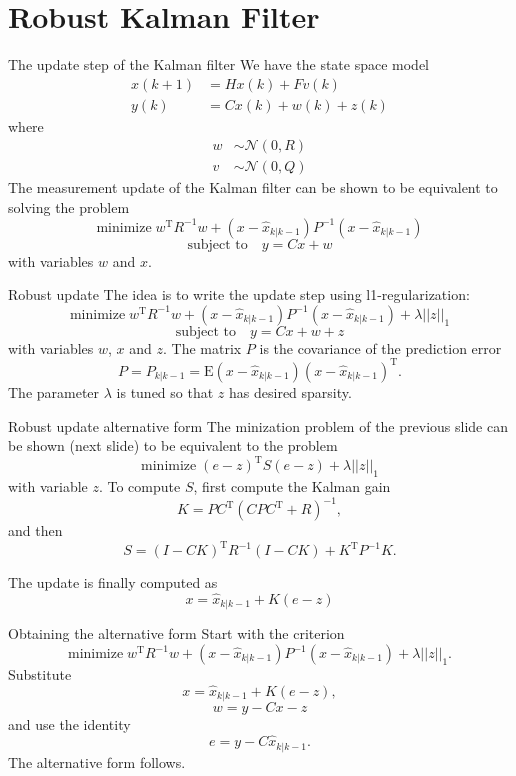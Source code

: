 \documentclass[presentation,aspectratio=169]{beamer}
\begin{document}
\section{Robust Kalman Filter}
\label{sec-3}
\begin{frame}[label=sec-3-1]{The update step of the Kalman filter}
We have the state space model
\begin{align*}
x(k+1) &= Hx(k) + Fv(k)\\
y(k) &= Cx(k) + w(k) + z(k)
\end{align*}
where
\begin{align*}
w &\sim \mathcal{N}(0,R)\\
v &\sim \mathcal{N}(0,Q)
\end{align*}
The measurement update of the Kalman filter can be shown to be equivalent to solving the problem
\[ \text{minimize} \; w^{\mathrm{T}} R^{-1} w + (x-\hat{x}_{k|k-1})P^{-1}(x-\hat{x}_{k|k-1}) \]
\[ \text{subject to}\quad y = Cx + w \]
with variables $w$ and $x$.
\end{frame}
\begin{frame}[label=sec-3-2]{Robust update}
The idea is to write the update step using l1-regularization:
\[ \text{minimize} \; w^{\mathrm{T}} R^{-1} w + (x-\hat{x}_{k|k-1})P^{-1}(x-\hat{x}_{k|k-1}) + \lambda||z||_1 \]
\[ \text{subject to}\quad y = Cx + w + z \]
with variables $w$, $x$ and $z$. The matrix $P$ is the covariance of the prediction error
\[ P = P_{k|k-1} = \mathrm{E} (x-\hat{x}_{k|k-1})(x-\hat{x}_{k|k-1})^{\mathrm{T}}. \]
The parameter $\lambda$ is tuned so that $z$ has desired sparsity.
\end{frame}
\begin{frame}[label=sec-3-3]{Robust update alternative form}
The minization problem of the previous slide can be shown (next slide) to be equivalent to the problem
\[ \text{minimize} \; (e-z)^{\mathrm{T}} S (e-z) + \lambda||z||_1 \]
with variable $z$. To compute $S$, first compute the Kalman gain
\[ K = PC^{\mathrm{T}}(CPC^{\mathrm{T}} + R)^{-1}, \]
and then
\[ S = (I-CK)^{\mathrm{T}} R^{-1} (I-CK) + K^{\mathrm{T}} P^{-1} K. \]

The update is finally computed as
\[ x = \hat{x}_{k|k-1} + K(e-z) \]
\end{frame}
\begin{frame}[label=sec-3-4]{Obtaining the alternative form}
Start with the criterion 
\[ \text{minimize} \; w^{\mathrm{T}} R^{-1} w + (x-\hat{x}_{k|k-1})P^{-1}(x-\hat{x}_{k|k-1}) + \lambda||z||_1. \]
Substitute    \[ x = \hat{x}_{k|k-1} + K(e-z), \]
\[ w = y - Cx - z\] 
and use the identity \[e = y-C\hat{x}_{k|k-1}.\] The alternative form follows.
\end{frame}
\end{document}
